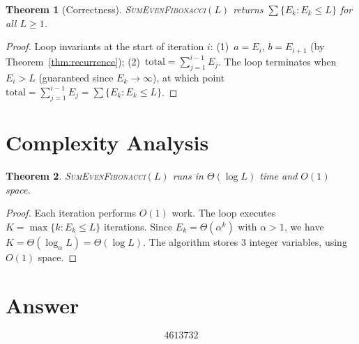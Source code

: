 \documentclass[11pt]{article}
\newtheorem{theorem}{Theorem}
\begin{document}
\begin{theorem}[Correctness]
\textsc{SumEvenFibonacci}$(L)$ returns $\sum\{E_k : E_k \le L\}$ for all $L \ge 1$.
\end{theorem}

\begin{proof}
Loop invariants at the start of iteration $i$: (1)~$a = E_i$, $b = E_{i+1}$ (by Theorem~\ref{thm:recurrence}); (2)~$\mathrm{total} = \sum_{j=1}^{i-1} E_j$. The loop terminates when $E_i > L$ (guaranteed since $E_k \to \infty$), at which point $\mathrm{total} = \sum_{j=1}^{i-1} E_j = \sum\{E_k : E_k \le L\}$.
\end{proof}

\section{Complexity Analysis}

\begin{theorem}
\textsc{SumEvenFibonacci}$(L)$ runs in $\Theta(\log L)$ time and $O(1)$ space.
\end{theorem}

\begin{proof}
Each iteration performs $O(1)$ work. The loop executes $K = \max\{k : E_k \le L\}$ iterations. Since $E_k = \Theta(\alpha^k)$ with $\alpha > 1$, we have $K = \Theta(\log_\alpha L) = \Theta(\log L)$. The algorithm stores 3 integer variables, using $O(1)$ space.
\end{proof}

\section{Answer}

\[
\boxed{4613732}
\]
\end{document}
